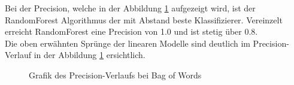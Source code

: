 Bei der Precision, welche in der Abbildung \cref{abb:bow-pre} aufgezeigt wird, ist der RandomForest Algorithmus der mit Abstand beste Klassifizierer.
Vereinzelt erreicht RandomForest eine Precision von 1.0 und ist stetig über 0.8.\\
Die oben erwähnten Sprünge der linearen Modelle sind deutlich im Precision-Verlauf in der Abbildung \cref{abb:bow-pre} ersichtlich.
\begin{figure}[H]	
	\setlength{\fboxsep}{0.3pt} 
	\setlength{\fboxrule}{0.3pt} 
	\caption{Grafik des Precision-Verlaufs bei Bag of Words}
	\label{abb:bow-pre}
\end{figure}
